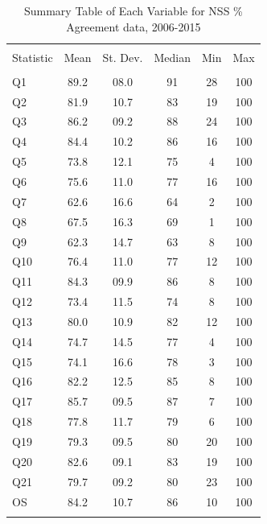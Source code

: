 \documentclass[11pt,a4paper]{report}
\begin{document}
\begin{table}[!htbp] \centering 
	\caption{Summary Table of Each Variable for NSS \% Agreement data, 2006-2015} 
	\label{table:varbsummary} 
	\begin{tabular}{@{\extracolsep{5pt}}lccccc} 
		\\[-1.8ex]\hline 
		\hline \\[-1.8ex] 
		Statistic & \multicolumn{1}{c}{Mean} & \multicolumn{1}{c}{St. Dev.} & \multicolumn{1}{c}{Median} & \multicolumn{1}{c}{Min} & \multicolumn{1}{c}{Max} \\ 
		\hline \\[-1.8ex] 
		Q1 & 89.2 & 08.0 & 91 & 28 & 100 \\ 
		Q2 & 81.9 & 10.7 & 83 & 19 & 100 \\ 
		Q3 & 86.2 & 09.2 & 88 & 24 & 100 \\ 
		Q4 & 84.4 & 10.2 & 86 & 16 & 100 \\ 
		Q5 & 73.8 & 12.1 & 75 & 4 & 100 \\ 
		Q6 & 75.6 & 11.0 & 77 & 16 & 100 \\ 
		Q7 & 62.6 & 16.6 & 64 & 2 & 100 \\ 
		Q8 & 67.5 & 16.3 & 69 & 1 & 100 \\ 
		Q9 & 62.3 & 14.7 & 63 & 8 & 100 \\ 
		Q10 & 76.4 & 11.0 & 77 & 12 & 100 \\ 
		Q11 & 84.3 & 09.9 & 86 & 8 & 100 \\ 
		Q12 & 73.4 & 11.5 & 74 & 8 & 100 \\ 
		Q13 & 80.0 & 10.9 & 82 & 12 & 100 \\ 
		Q14 & 74.7 & 14.5 & 77 & 4 & 100 \\ 
		Q15 & 74.1 & 16.6 & 78 & 3 & 100 \\ 
		Q16 & 82.2 & 12.5 & 85 & 8 & 100 \\ 
		Q17 & 85.7 & 09.5 & 87 & 7 & 100 \\ 
		Q18 & 77.8 & 11.7 & 79 & 6 & 100 \\ 
		Q19 & 79.3 & 09.5 & 80 & 20 & 100 \\ 
		Q20 & 82.6 & 09.1 & 83 & 19 & 100 \\ 
		Q21 & 79.7 & 09.2 & 80 & 23 & 100 \\ 
		OS & 84.2 & 10.7 & 86 &10 & 100 \\ 
		\hline \hline \\[-1.8ex] 
	\end{tabular} 
\end{table}
\end{document}

